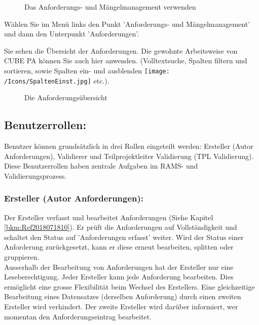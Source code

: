 \begin{figure}
\begin{center}
  \end{center}
  \vspace{-20pt}
  \caption{Das Anforderungs- und Mängelmanagement verwenden}
  \vspace{-10pt}
\end{figure}

Wählen Sie im Menü links den Punkt 'Anforderungs- und Mängelmanagement' und dann den Unterpunkt 'Anforderungen'.

\vspace{10.5cm}

Sie sehen die Übersicht der Anforderungen. Die gewohnte Arbeitsweise von CUBE PA können Sie auch hier anwenden. (Volltextsuche, Spalten filtern und sortieren, sowie Spalten ein- und ausblenden \texttt{[image: /Icons/SpaltenEinst.jpg]} etc.).

\begin{figure}[H]
\caption{Die Anforderungsübersicht}
\end{figure}

\subsection{Benutzerrollen:} 
Benutzer können grundsätzlich in drei Rollen eingeteilt werden: Ersteller (Autor Anforderungen), Validierer und Teilprojektleiter Validierung (TPL Validierung). Diese Benutzerrollen haben zentrale Aufgaben im RAMS- und Validierungsprozess.

\subsubsection{Ersteller (Autor Anforderungen):} 
Der Ersteller verfasst und bearbeitet Anforderungen (Siehe Kapitel \ref{bkm:Ref2018071810}). Er prüft die Anforderungen auf Vollständigkeit und schaltet den Status auf 'Anforderungen erfasst' weiter. Wird der Status einer Anforderung zurückgesetzt, kann er diese erneut bearbeiten, splitten oder gruppieren. \\
Ausserhalb der Bearbeitung von Anforderungen hat der Ersteller nur eine Leseberechtigung. Jeder Ersteller kann jede Anforderung bearbeiten. Dies ermöglicht eine grosse Flexibilität beim Wechsel des Erstellers. Eine gleichzeitige Bearbeitung eines Datensatzes (derselben Anforderung) durch einen zweiten Ersteller wird verhindert. Der zweite Ersteller wird darüber informiert, wer momentan den Anforderungseintrag bearbeitet. 

